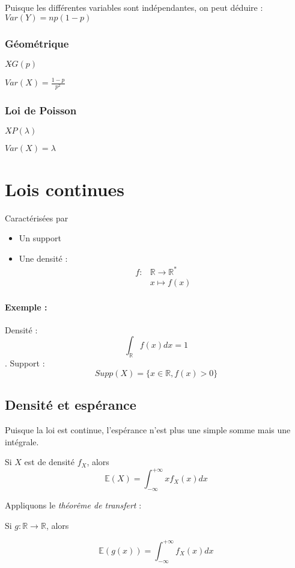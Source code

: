 \documentclass{article}
\begin{document}
Puisque les différentes variables sont indépendantes, on peut déduire :
$Var(Y) = np(1-p)$

\subsubsection{Géométrique}
$X \tilde{} G(p)$

$Var(X) = \frac{1-p}{p^2}$

\subsubsection{Loi de Poisson}
$X \tilde{} P(\lambda)$

$Var(X) = \lambda$

\section{Lois continues}

Caractérisées par
\begin{itemize}
  \item Un support
  \item Une densité :
  \begin{align*}
    f: &\mathbb{R} \to \mathbb{R}^{*} \\
    &x \mapsto f(x)
  \end{align*}
\end{itemize}

\paragraph{Exemple :}
Densité : $$ \int_{\mathbb{R}} f(x)dx = 1 $$.
Support : $$ Supp(X) = \{ x \in \mathbb{R}, f(x) > 0 \}$$

\subsection{Densité et espérance}
Puisque la loi est continue, l'espérance n'est plus une simple somme mais une
intégrale.

Si $X$ est de densité $f_{X}$, alors $$\mathbb{E}(X) = \int_{- \infty}^{+ \infty} x f_{X}(x) dx$$

Appliquons le \textit{théorême de transfert} :

Si $g : \mathbb{R} \to \mathbb{R}$, alors

$$\mathbb{E}(g(x)) = \int_{- \infty}^{+ \infty} f_{X}(x)dx $$
\end{document}
